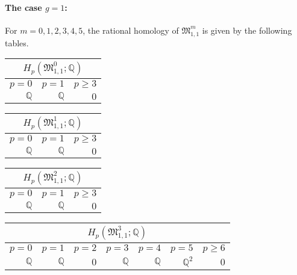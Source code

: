 \paragraph{The case \texorpdfstring{$g=1$}{g=1}:}
For $m = 0,1,2,3,4,5$, the rational homology of $\mathfrak M_{1,1}^m$ is given by the following tables.
\begin{center}
    \begin{tabular}{|r|r|r|}
        \hline
        \multicolumn{3}{|c|}{$H_p( \mathfrak{M}_{1,1}^0; \mathbb Q )$} \\ \hline
        $p=0$&$p=1$&$p\ge3$\\ \hline \hline
        $\mathbb Q$&$\mathbb Q$&$0$\\ \hline
    \end{tabular}
    
    \vspace{2.5ex}
    
    \begin{tabular}{|r|r|r|}
        \hline
        \multicolumn{3}{|c|}{$H_p( \mathfrak{M}_{1,1}^1; \mathbb Q )$} \\ \hline
        $p=0$&$p=1$&$p\ge3$\\ \hline \hline
        $\mathbb Q$&$\mathbb Q$&$0$\\ \hline
    \end{tabular}
    
    \vspace{2.5ex}
    
    \begin{tabular}{|r|r|r|}
        \hline
        \multicolumn{3}{|c|}{$H_p( \mathfrak{M}_{1,1}^2; \mathbb Q )$} \\ \hline
        $p=0$&$p=1$&$p\ge3$\\ \hline \hline
        $\mathbb Q$&$\mathbb Q$&$0$\\ \hline
    \end{tabular}
    
    \vspace{2.5ex}
    
    \begin{tabular}{|r|r|r|r|r|r|r|}
        \hline
        \multicolumn{7}{|c|}{$H_p( \mathfrak{M}_{1,1}^3; \mathbb Q )$} \\ \hline
        $p=0$&$p=1$&$p=2$&$p=3$&$p=4$&$p=5$&$p\ge6$\\ \hline \hline
        $\mathbb Q$&$\mathbb Q$&$0$&$\mathbb Q$&$\mathbb Q$&$\mathbb Q^2$&$0$\\ \hline
    \end{tabular}
    

\end{center}
